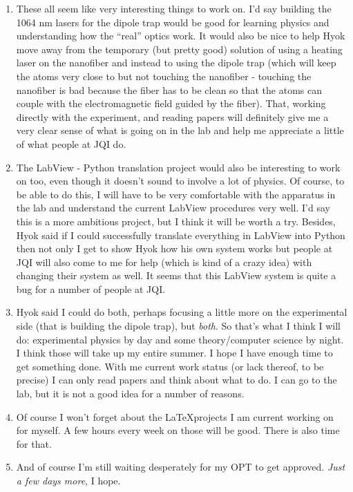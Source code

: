 \documentclass{report}
\theoremstyle{definition}
\begin{document}
\begin{enumerate}
	
	\item These all seem like very interesting things to work on. I'd say building the 1064 nm lasers for the dipole trap would be good for learning physics and understanding how the ``real'' optics work. It would also be nice to help Hyok move away from the temporary (but pretty good) solution of using a heating laser on the nanofiber and instead to using the dipole trap (which will keep the atoms very close to but not touching the nanofiber - touching the nanofiber is bad because the fiber has to be clean so that the atoms can couple with the electromagnetic field guided by the fiber). That, working directly with the experiment, and reading papers will definitely give me a very clear sense of what is going on in the lab and help me appreciate a little of what people at JQI do. 
	
	
	\item The LabView - Python translation project would also be interesting to work on too, even though it doesn't sound to involve a lot of physics. Of course, to be able to do this, I will have to be very comfortable with the apparatus in the lab and understand the current LabView procedures very well. I'd say this is a more ambitious project, but I think it will be worth a try. Besides, Hyok said if I could successfully translate everything in LabView into Python then not only I get to show Hyok how his own system works but people at JQI will also come to me for help (which is kind of a crazy idea) with changing their system as well. It seems that this LabView system is quite a bug for a number of people at JQI. 
	
	
	\item Hyok said I could do both, perhaps focusing a little more on the experimental side (that is building the dipole trap), but \textit{both}. So that's what I think I will do: experimental physics by day and some theory/computer science by night. I think those will take up my entire summer. I hope I have enough time to get something done. With me current work status (or lack thereof, to be precise) I can only read papers and think about what to do. I can go to the lab, but it is not a good idea for a number of reasons.
	
	
	\item Of course I won't forget about the \LaTeX projects I am current working on for myself. A few hours every week on those will be good. There is also time for that. 
	
	\item And of course I'm still waiting desperately for my OPT to get approved. \textit{Just a few days more}, I hope. 
	
	
	\end{enumerate}
\end{document}
